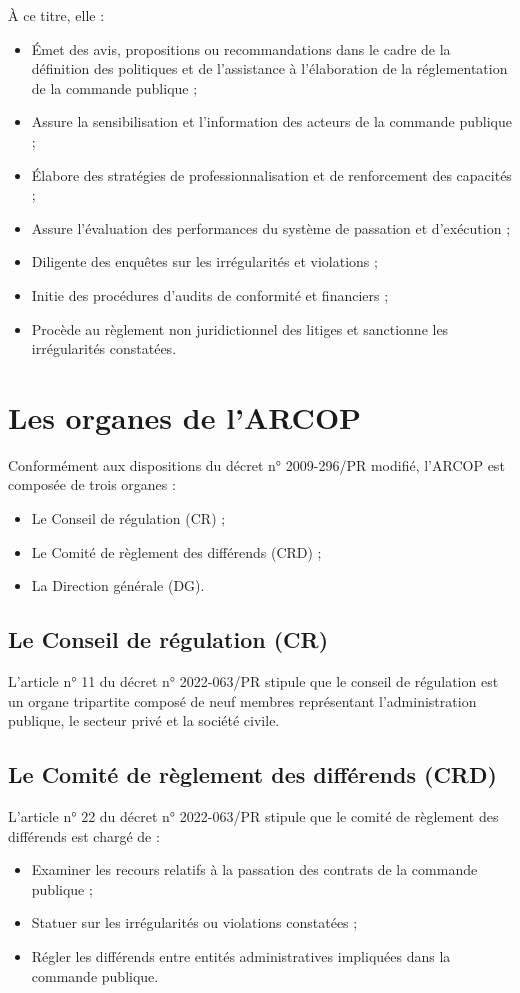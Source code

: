 À ce titre, elle :
\begin{itemize}
    \item Émet des avis, propositions ou recommandations dans le cadre de la définition des politiques et de l'assistance à l'élaboration de la réglementation de la commande publique ;
    \item Assure la sensibilisation et l'information des acteurs de la commande publique ;
    \item Élabore des stratégies de professionnalisation et de renforcement des capacités ;
    \item Assure l’évaluation des performances du système de passation et d’exécution ;
    \item Diligente des enquêtes sur les irrégularités et violations ;
    \item Initie des procédures d'audits de conformité et financiers ;
    \item Procède au règlement non juridictionnel des litiges et sanctionne les irrégularités constatées.
\end{itemize}

\section{Les organes de l’\ac{ARCOP}}
Conformément aux dispositions du décret n° 2009-296/PR modifié, l’\ac{ARCOP} est composée de trois organes :
\begin{itemize}
    \item Le Conseil de régulation (CR) ;
    \item Le Comité de règlement des différends (CRD) ;
    \item La Direction générale (DG).
\end{itemize}

\subsection{Le Conseil de régulation (CR)}
L’article n° 11 du décret n° 2022-063/PR stipule que le conseil de régulation est un organe tripartite composé de neuf membres représentant l’administration publique, le secteur privé et la société civile.

\subsection{Le Comité de règlement des différends (CRD)}
L’article n° 22 du décret n° 2022-063/PR stipule que le comité de règlement des différends est chargé de :
\begin{itemize}
    \item Examiner les recours relatifs à la passation des contrats de la commande publique ;
    \item Statuer sur les irrégularités ou violations constatées ;
    \item Régler les différends entre entités administratives impliquées dans la commande publique.
\end{itemize}

